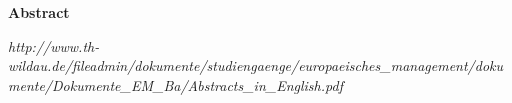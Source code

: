 
\pagestyle{empty}

\vspace{\fill}

\begin{center}
\textbf{Abstract}\\
\end{center}
\vspace{0.2cm}  
     
\lipsum[8]
 \emph{http://www.th-wildau.de/fileadmin/dokumente/studiengaenge/europaeisches_management/dokumente/Dokumente_EM_Ba/Abstracts_in_English.pdf}
\vspace{\fill}
   
